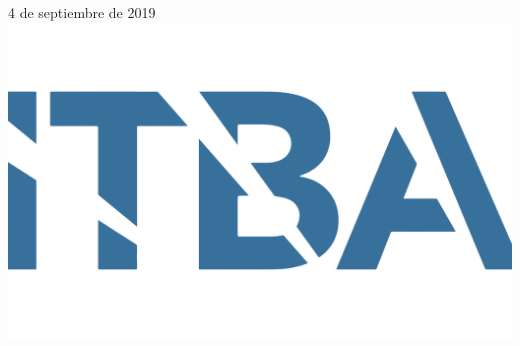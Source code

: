 \begin{titlepage}


{\large 4 de septiembre de 2019}\\[1cm] %


\includegraphics[scale=0.2]{images/caratula/logo2.png}\\[1cm] %
    

\vfill %

\end{titlepage}